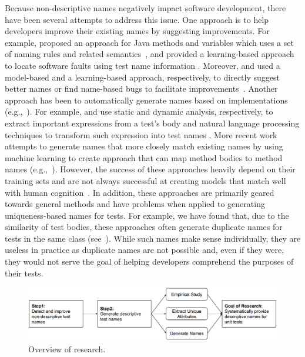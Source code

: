 Because non-descriptive names negatively impact software development, there have been several attempts to address this issue.
%
One approach is to help developers improve their existing names by suggesting improvements.
%
For example, \citeauthor{host2009debugging} proposed an approach for Java methods and variables which uses a set of naming rules and related semantics~\cite{host2009debugging}, and \citeauthor{li2019deepfl} provided a learning-based approach to locate software faults using test name information \cite{li2019deepfl}.
%
Moreover, \citeauthor{allamanis2015suggesting} and \citeauthor{pradel2018deepbugs} used a model-based and a learning-based approach, respectively, to directly suggest better names or find name-based bugs to facilitate improvements~\cite{allamanis2015suggesting,pradel2018deepbugs}.
%
Another approach has been to automatically generate names based on implementations (e.g.,~\cite{arcuri2014automated, zhang2016towards, daka2017generating}).
%
For example, \citeauthor{zhang2016towards} and \citeauthor{daka2017generating} use static and dynamic analysis, respectively, to extract important expressions from a test's body and natural language processing techniques to transform such expression into test names \cite{zhang2016towards,daka2017generating}.
%
More recent work attempts to generate names that more closely match existing names by using machine learning to create approach that can map method bodies to method names (e.g.,~\cite{alon2018code2seq,alon2019code2vec}).
%
However, the success of these approaches heavily depend on their training sets and are not always successful at creating models that match well with human cognition~\cite{lison2015introduction}.
%
In addition, these approaches are primarily geared towards general methods and have problems when applied to generating uniqueness-based names for tests.
%
For example, we have found that, due to the similarity of test bodies, these approaches often generate duplicate names for tests in the same class (see~\cite{CodeResult}).
%
While such names make sense individually, they are useless in practice as duplicate names are not possible and, even if they were, they would not serve the goal of helping developers comprehend the purposes of their tests.


\begin{figure}[t]
\centering
\includegraphics[scale=0.35]{figures/all-research.png}
\caption{Overview of research.}
\label{fig:all-research}
\end{figure}


